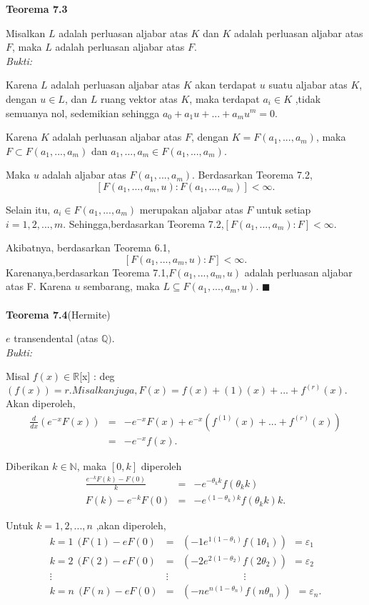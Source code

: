 	\textbf{Teorema 7.3}
\par 	Misalkan $L$ adalah perluasan aljabar atas $K$ dan $K$ adalah perluasan aljabar atas $F$, maka $L$ adalah perluasan aljabar atas $F$.\\
	\textit{Bukti:}
\par 	Karena $L$ adalah perluasan aljabar atas $K$ akan terdapat $u$ suatu aljabar atas $K$, dengan $u\in L$, dan $L$ ruang vektor atas $K$, maka terdapat $a_i \in K$ ,tidak semuanya nol, sedemikian sehingga $a_0+a_1u+...+a_mu^m=0.$
\par 	Karena $K$ adalah perluasan aljabar atas $F$, dengan $K=F(a_1,...,a_m)$, maka $F \subset F(a_1,...,a_m)$ dan $a_1,...,a_m \in F(a_1,...,a_m)$.
\par 	Maka $u$ adalah aljabar atas $F(a_1,...,a_m)$. Berdasarkan Teorema 7.2, $$[F(a_1,...,a_m,u):F(a_1,...,a_m)] < \infty.$$
\par 	Selain itu, $a_i \in F(a_1,...,a_m)$ merupakan aljabar atas $F$ untuk setiap $i=1,2,...,m.$ Sehingga,berdasarkan Teorema 7.2,$[F(a_1,...,a_m) : F]< \infty$.
\par 	Akibatnya, berdasarkan Teorema 6.1, $$[F(a_1,...,a_m,u): F]< \infty.$$ 
	Karenanya,berdasarkan Teorema 7.1,$F(a_1,...,a_m,u)$ adalah perluasan aljabar atas F. Karena $u$ sembarang, maka $L \subseteq F(a_1,...,a_m,u).$ $\blacksquare$
\\
\\
	\textbf{Teorema 7.4}(Hermite)
\par 	$e$ transendental (atas $\mathbb{Q}).$
\\
	\textit{Bukti:}
\par 	Misal $f(x) \in \mathbb{R}$[x] : deg$(f(x))=r. Misalkan juga, F(x)=f(x) + {(1)}(x)+...+f^{(r)}(x).$Akan diperoleh,
	$$\begin{array}{rcl}	
	\frac{d}{dx}(e^{-x}F(x)) &=& -e^{-x}F(x) + e^{-x}(f^{(1)}(x)+...+f^{(r)}(x))\\
	&=&  -e^{-x}f(x).
	\end{array}$$
\par 	Diberikan $k \in \mathbb{N}$, maka $[0,k]$ diperoleh
	$$\begin{array}{rcl}
	\frac{e^{-k}F(k) - F(0)}{k} &=& -e^{-\theta_k k}f(\theta_k k)\\
	F(k) - e^{-k}F(0) &=& -e^{(1-\theta_k) k}f(\theta_k k) k.
	\end{array}$$
\par 	Untuk $k=1,2,...,n$ ,akan diperoleh,
	$$\begin{array}{rcl}
	k=1~~(F(1) - eF(0) &=&  (-1e^{1(1-\theta_1) }f(1\theta_1))~~=\varepsilon_1 \\
	k=2~~(F(2) - eF(0) &=&  (-2e^{2(1-\theta_2) }f(2\theta_2))~~=\varepsilon_2\\
	\vdots~~~~~~~~~~~~~~~~~~~~~~~~ &\vdots& ~~~~~~~~~~~~~~~~~~~~~~~~~~~~\vdots\\
	k=n~~(F(n) - eF(0) &=&  (-ne^{n(1-\theta_n) }f(n\theta_n))~~=\varepsilon_n.
	\end{array}$$

